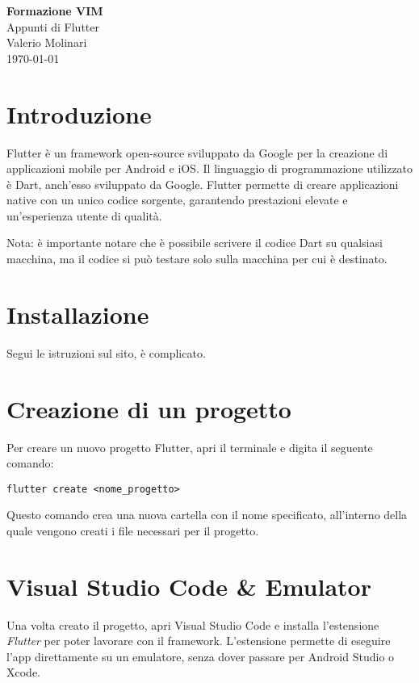 \documentclass[12pt]{article}
\begin{document}
\begin{titlepage}
\begin{center}
\vspace*{3cm}
\Huge\textcolor{primary}{\textbf{Formazione VIM}} \\[1cm]
\Large\textcolor{secondary}{Appunti di Flutter} \\[1cm]
\textcolor{accent}{Valerio Molinari}\\
\vfill
\today
\end{center}
\end{titlepage}

\tableofcontents
\newpage

\section{Introduzione}
Flutter è un framework open-source sviluppato da Google per la creazione 
di applicazioni mobile per Android e iOS. 
Il linguaggio di programmazione utilizzato è Dart, 
anch'esso sviluppato da Google. 
Flutter permette di creare applicazioni native con un unico codice sorgente, 
garantendo prestazioni elevate e un'esperienza utente di qualità.

\begin{highlight}
Nota: è importante notare che è possibile scrivere il codice Dart su qualsiasi
macchina, ma il codice si può testare solo sulla macchina per cui è destinato.
\end{highlight}

\section{Installazione}
Segui le istruzioni sul sito, è complicato.

\section{Creazione di un progetto}
Per creare un nuovo progetto Flutter, apri il terminale e digita il seguente comando:
\begin{verbatim}
flutter create <nome_progetto>
\end{verbatim}
Questo comando crea una nuova cartella con il nome specificato, 
all'interno della quale vengono creati i file necessari per il progetto.

\section{Visual Studio Code \& Emulator} 
Una volta creato il progetto, apri Visual Studio Code e installa l'estensione
\textit{Flutter} per poter lavorare con il framework.
L'estensione permette di eseguire l'app direttamente su un emulatore,
senza dover passare per Android Studio o Xcode.
\end{document}
